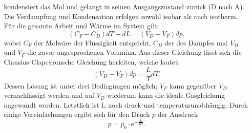 kondensiert das Mol und gelangt in seinen Ausgangszustand zurück (D nach A).
Die Verdampfung und Kondensation erfolgen sowohl isobar als auch isotherm.
Für die gesamte Arbeit und Wärme im System gilt:
\begin{equation}
    (C_F-C_D)dT + dL = (V_D-V_F)dp,
\end{equation}
wobei $C_F$ der Molwäre der Flüssigkeit entspricht, $C_D$ der des Dampfes und 
$V_D$ und $V_F$ die zuvor angesprochenen Volumina. Aus dieser Gleichung lässt 
sich die Clausius-Clapeyronsche Gleichung herleiten, welche lautet:
\begin{equation}
    (V_D-V_F)dp = \frac{L}{T}dT.
\end{equation}
Dessen Lösung ist unter drei Bedingungen möglich; $V_F$ kann gegenüber $V_D$
vernachlässigt werden und auf $V_D$ wiederum kann die ideale Gasgleichung
angewandt werden. Letztlich ist L noch druck-und temperaturunabhängig.
Durch einige Vereinfachungen ergibt sich für den Druch $p$ der Ausdruck
\begin{equation}
    p = p_0 \cdot e^{-\frac{L}{RT}}.
\end{equation}